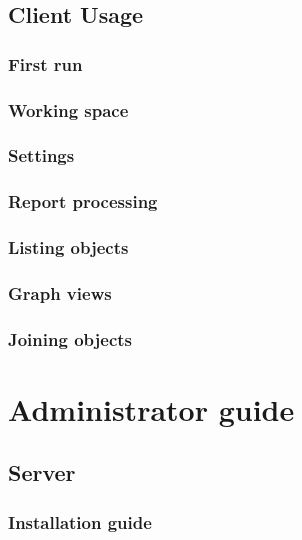 \documentclass[12pt,a4paper]{report}
\begin{document}
\section{Client Usage}

\subsection{First run}

\subsection{Working space}

\subsection{Settings}
\label{ssec:Settings}

\subsection{Report processing}

\subsection{Listing objects}

\subsection{Graph views}

\subsection{Joining objects}

\chapter{Administrator guide}


\section{Server}

\subsection{Installation guide}
\end{document}
